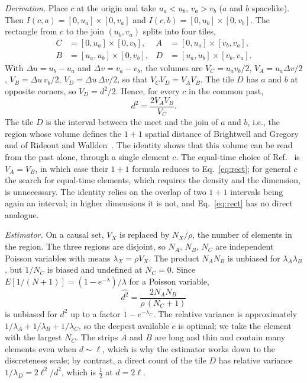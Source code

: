 \documentclass[prd,twocolumn,superscriptaddress,nofootinbib,amsmath,amssymb,floatfix]{revtex4-2}
\begin{document}
\emph{Derivation.} Place $c$ at the origin and take $u_a<u_b$, $v_a>v_b$ ($a$ and $b$ spacelike). Then $I(c,a)=[0,u_a]\times[0,v_a]$ and $I(c,b)=[0,u_b]\times[0,v_b]$. The rectangle from $c$ to the join $(u_b,v_a)$ splits into four tiles,
\begin{equation}
\begin{aligned}
C&=[0,u_a]\times[0,v_b], & A&=[0,u_a]\times[v_b,v_a],\\
B&=[u_a,u_b]\times[0,v_b], & D&=[u_a,u_b]\times[v_b,v_a].
\end{aligned}
\end{equation}
With $\Delta u=u_b-u_a$ and $\Delta v=v_a-v_b$, the volumes are $V_C=u_av_b/2$, $V_A=u_a\Delta v/2$, $V_B=\Delta u\,v_b/2$, $V_D=\Delta u\,\Delta v/2$, so that $V_CV_D=V_AV_B$. The tile $D$ has $a$ and $b$ at opposite corners, so $V_D=d^2/2$. Hence, for every $c$ in the common past,
\begin{equation}
d^2=\frac{2V_AV_B}{V_C}.
\label{eq:rect}
\end{equation}
The tile $D$ is the interval between the meet and the join of $a$ and $b$, i.e., the region whose volume defines the $1+1$ spatial distance of Brightwell and Gregory and of Rideout and Wallden~\cite{BrightwellGregory91,RideoutWallden09}. The identity shows that this volume can be read from the past alone, through a single element $c$. The equal-time choice of Ref.~\cite{BK24} is $V_A=V_B$, in which case their $1+1$ formula reduces to Eq.~\eqref{eq:rect}; for general $c$ the search for equal-time elements, which requires the density and the dimension, is unnecessary. The identity relies on the overlap of two $1+1$ intervals being again an interval; in higher dimensions it is not, and Eq.~\eqref{eq:rect} has no direct analogue.

\emph{Estimator.} On a causal set, $V_X$ is replaced by $N_X/\rho$, the number of elements in the region. The three regions are disjoint, so $N_A$, $N_B$, $N_C$ are independent Poisson variables with means $\lambda_X=\rho V_X$. The product $N_AN_B$ is unbiased for $\lambda_A\lambda_B$, but $1/N_C$ is biased and undefined at $N_C=0$. Since $E[1/(N+1)]=(1-e^{-\lambda})/\lambda$ for a Poisson variable,
\begin{equation}
\widehat{d^2}=\frac{2N_AN_B}{\rho\,(N_C+1)}
\label{eq:est}
\end{equation}
is unbiased for $d^2$ up to a factor $1-e^{-\lambda_C}$. The relative variance is approximately $1/\lambda_A+1/\lambda_B+1/\lambda_C$, so the deepest available $c$ is optimal; we take the element with the largest $N_C$. The strips $A$ and $B$ are long and thin and contain many elements even when $d\sim\ell$, which is why the estimator works down to the discreteness scale; by contrast, a direct count of the tile $D$ has relative variance $1/\lambda_D=2\ell^2/d^2$, which is $\tfrac12$ at $d=2\ell$.
\end{document}
